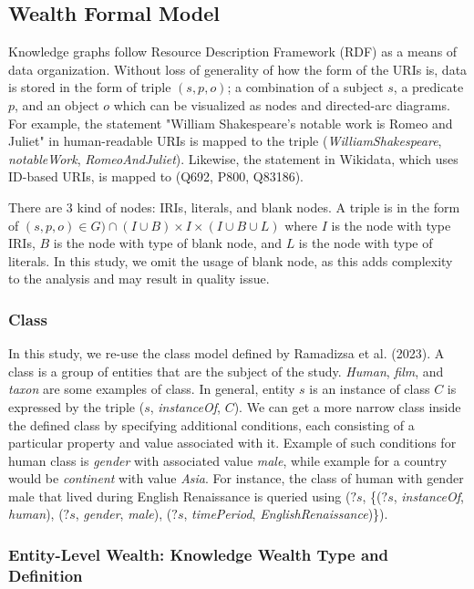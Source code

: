 \subsection{Wealth Formal Model} \label{wealth-formal-model}
Knowledge graphs follow Resource Description Framework (RDF) as a means of data organization. Without loss of generality of how the form of the URIs is, data is stored in the form of triple \((s, p, o)\); a combination of a subject \(s\), a predicate \(p\), and an object \(o\) which can be visualized as nodes and directed-arc diagrams. For example, the statement "William Shakespeare's notable work is Romeo and Juliet" in human-readable URIs is mapped to the triple (\textit{WilliamShakespeare}, \textit{notableWork}, \textit{RomeoAndJuliet}). Likewise, the statement in Wikidata, which uses ID-based URIs, is mapped to (Q692, P800, Q83186).

There are 3 kind of nodes: IRIs, literals, and blank nodes. A triple is in the form of \((s, p, o) \in G) \cap (I \cup B) \times I \times (I \cup B \cup L) \) where \(I\) is the node with type IRIs, \(B\) is the node with type of blank node, and \(L\) is the node with type of literals. In this study, we omit the usage of blank node, as this adds complexity to the analysis and may result in quality issue.

\subsubsection{Class}
In this study, we re-use the class model defined by Ramadizsa et al. (2023). A class is a group of entities that are the subject of the study. \textit{Human}, \textit{film}, and \textit{taxon} are some examples of class. In general, entity \(s\) is an instance of class \(C\) is expressed by the triple (\(s\), \textit{instanceOf}, \(C\)). We can get a more narrow class inside the defined class by specifying additional conditions, each consisting of a particular property and value associated with it. Example of such conditions for human class is \textit{gender} with associated value \textit{male}, while example for a country would be \textit{continent} with value \textit{Asia}. For instance, the class of human with gender male that lived during English Renaissance is queried using (\(?s\), \{(\(?s\), \textit{instanceOf}, \textit{human}), (\(?s\), \textit{gender}, \textit{male}), (\(?s\), \textit{timePeriod}, \textit{EnglishRenaissance})\}).

\subsubsection{Entity-Level Wealth: Knowledge Wealth Type and Definition}

